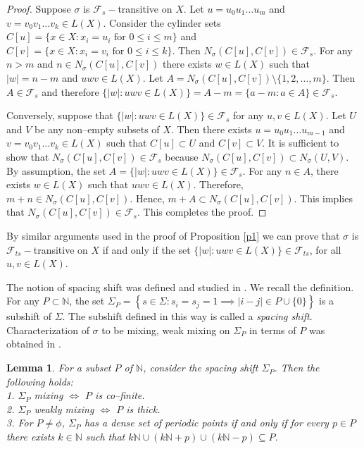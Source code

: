 \documentclass{amsart}[12pt, papera4]
\newtheorem{lemma}[theorem]{Lemma}
\theoremstyle{definition}
\theoremstyle{remark}
\numberwithin{equation}{section}
\def\N{{\mathbb N}}
\def\F{{\mathscr{F}}}
\begin{document}
\begin{proof}
	Suppose $\sigma$ is $\F_s-$transitive on $X$. Let $u=u_0u_1\dots u_m$ and $v=v_0v_1 \dots v_k \in L(X)$. Consider the cylinder sets $C[u]=\{x\in X:x_i=u_i \text{ for } 0\leq i\leq m\}$ and $C[v]=\{x\in X:x_i=v_i \text{ for } 0\leq i\leq k\}$. Then $N_{\sigma}(C[u],C[v])\in \F_s$. For any $n>m$ and $n\in N_{\sigma}(C[u],C[v])$ there exists $w\in L(X)$ such that $|w|=n-m$ and $uwv\in L(X)$. Let $A=N_{\sigma}(C[u],C[v])\setminus \{1,2,\dots,m\}$. Then $A\in \F_s$ and therefore $\{|w|:uwv\in L(X)\}=A-m=\{a-m:a\in A\} \in \F_s$.
	
	\medskip
	\noindent Conversely, suppose that $\{|w|:uwv\in L(X)\}\in \F_s$ for any $u,v\in L(X)$. Let $U$ and $V$ be any non--empty subsets of $X$. Then there exists $u=u_0u_1\dots u_{m-1}$ and $v=v_0v_1\dots v_k \in L(X)$ such that $C[u]\subset U$ and $C[v]\subset V$. It is sufficient to show that $N_{\sigma}(C[u],C[v])\in \F_s$ because $N_{\sigma}(C[u],C[v])\subset N_{\sigma}(U,V)$. By assumption, the set $A=\{|w|:uwv\in L(X)\}\in \F_s$. For any $n\in A$, there exists $w\in L(X)$ such that $uwv\in L(X)$. Therefore, $m+n\in N_{\sigma}(C[u],C[v])$. Hence, $m+A\subset  N_{\sigma}(C[u],C[v])$. This implies that $N_{\sigma}(C[u],C[v])\in \F_s$. This completes the proof.
\end{proof}


\noindent By similar arguments used in the proof of Proposition \ref{p1} we can prove that $\sigma$ is $\F_{ts}-$transitive on $X$ if and only if the set $\{|w|:uwv\in L(X)\}\in \F_{ts}$, for all $u,v\in L(X)$.  

\medskip
\noindent The notion of spacing shift was defined and studied in \cite{Banks}. We recall the definition. For any $P\subset \N$, the set $\Sigma_P=\left\{s\in \Sigma:s_i=s_j=1\implies |i-j|\in P\cup \{0\}\right\}$ is a subshift of $\Sigma$. The subshift defined in this way is called a \emph{spacing shift}. Characterization of $\sigma$ to be mixing, weak mixing on $\Sigma_P$ in terms of $P$ was obtained in \cite{Banks}.

\smallskip
\begin{lemma}\cite{Banks} \label{T00}
	For a subset $P$ of $\N$, consider the spacing shift $\Sigma_P$. Then the following holds:\\
	1. $\Sigma_P$ mixing $\iff$ $P$ is co--finite.\\
	2. $\Sigma_P$ weakly mixing $\iff$ $P$ is thick.\\
	3. For $P\neq \phi$, $\Sigma_P$ has a dense set of periodic points if and only if for every $p\in P$ there exists $k\in \N$ such that $k\N \cup (k\N+p) \cup (k\N-p)\subseteq P$. 
\end{lemma}	
\end{document}
